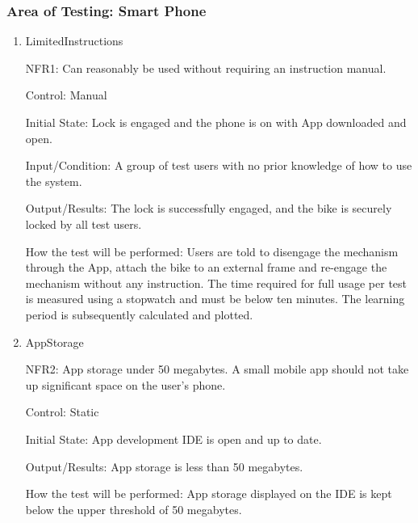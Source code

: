 \documentclass[12pt, titlepage]{article}
\begin{document}
\subsubsection{Area of Testing: Smart Phone}

\begin{enumerate}

\item{LimitedInstructions

NFR1: Can reasonably be used without requiring an instruction manual. }

Control: Manual

Initial State: Lock is engaged and the phone is on with App downloaded and open.

Input/Condition: A group of test users with no prior knowledge of how to use the system. 

Output/Results: The lock is successfully engaged, and the bike is securely locked by all test users.

How the test will be performed: Users are told to disengage the mechanism through the App, attach the bike to an external frame and re-engage the mechanism without any instruction. The time required for full usage per test is measured using a stopwatch and must be below ten minutes. The learning period is subsequently calculated and plotted. 

\item{AppStorage

NFR2: App storage under 50 megabytes. A small mobile app should not take up significant space on the user’s phone.  }

Control: Static 

Initial State: App development IDE is open and up to date.

Output/Results: App storage is less than 50 megabytes.

How the test will be performed: App storage displayed on the IDE is kept below the upper threshold of 50 megabytes. 

\end{enumerate}
\end{document}
